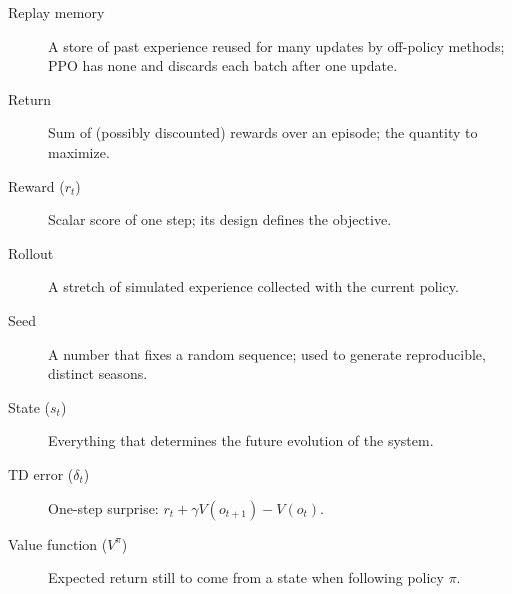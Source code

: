 \begin{description}
\item[Replay memory] A store of past experience reused for many updates by off-policy methods; PPO has none and discards each batch after one update.
\item[Return] Sum of (possibly discounted) rewards over an episode; the quantity to maximize.
\item[Reward ($r_t$)] Scalar score of one step; its design defines the objective.
\item[Rollout] A stretch of simulated experience collected with the current policy.
\item[Seed] A number that fixes a random sequence; used to generate reproducible, distinct seasons.
\item[State ($s_t$)] Everything that determines the future evolution of the system.
\item[TD error ($\delta_t$)] One-step surprise: $r_t+\gamma V(o_{t+1})-V(o_t)$.
\item[Value function ($V^\pi$)] Expected return still to come from a state when following policy $\pi$.
\end{description}
